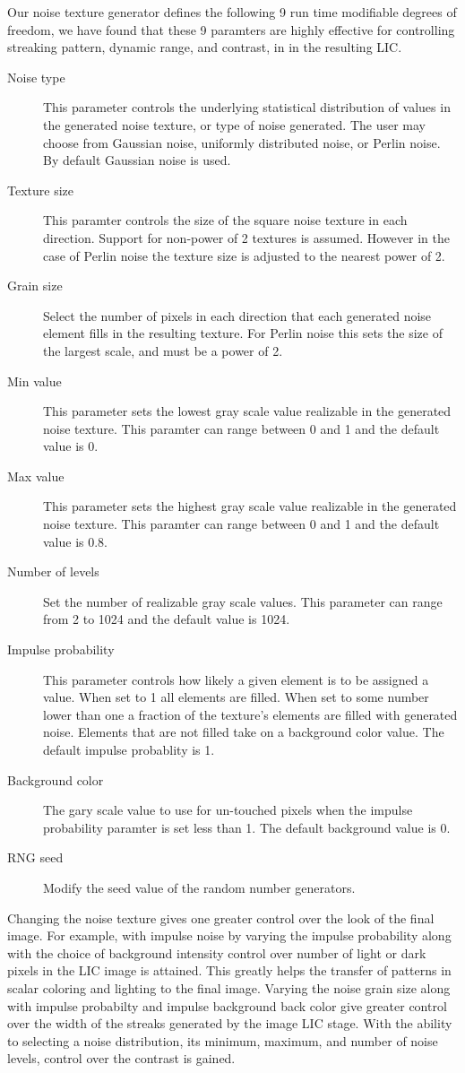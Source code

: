 \documentclass[a4paper,10pt]{article}
\begin{document}
Our noise texture generator defines the following 9 run time modifiable degrees of freedom, we have found that these 9 paramters are highly effective for controlling streaking pattern, dynamic range, and contrast, in in the resulting LIC.
\begin{description}
\item[Noise type] This parameter controls the underlying statistical distribution of values in the generated noise texture, or type of noise generated. The user may choose from Gaussian noise, uniformly distributed noise, or Perlin noise. By default Gaussian noise is used.
\item[Texture size] This paramter controls the size of the square noise texture in each direction. Support for non-power of 2 textures is assumed. However in the case of Perlin noise the texture size is adjusted to the nearest power of 2.
\item[Grain size] Select the number of pixels  in each direction that each generated noise element fills in the resulting texture. For Perlin noise this sets the size of the largest scale, and must be a power of 2.
\item[Min value] This parameter sets the lowest gray scale value realizable in the generated noise texture. This paramter can range between 0 and 1 and the default value is 0.
\item[Max value] This parameter sets the highest gray scale value realizable in the generated noise texture. This paramter can range between 0 and 1 and the default value is 0.8.
\item[Number of levels] Set the number of realizable gray scale values. This parameter can range from 2 to 1024 and the default value is 1024.
\item[Impulse probability] This parameter controls how likely a given element is to be assigned a value. When set to 1 all elements are filled. When set to some number lower than one a fraction of the texture's elements are filled with generated noise. Elements that are not filled take on a background color value. The default impulse probablity is 1.
\item[Background color] The gary scale value to use for un-touched pixels when the impulse probability paramter is set less than 1. The default background value is 0.
\item[RNG seed] Modify the seed value of the random number generators.
\end{description}
Changing the noise texture gives one greater control over the look of the final image. For example, with impulse noise by varying the impulse probability along with the choice of background intensity control over number of light or dark pixels in the LIC image is attained. This greatly helps the transfer of patterns in scalar coloring and lighting to the final image. Varying the noise grain size along with impulse probabilty and impulse background back color give greater control over the width of the streaks generated by the image LIC stage. With the ability to selecting a noise distribution, its minimum, maximum, and number of noise levels, control over the contrast is gained. 
\FloatBarrier
\end{document}
